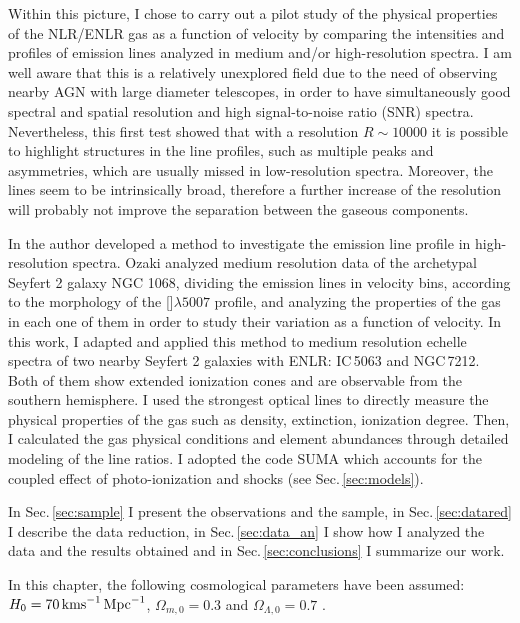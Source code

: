 \documentclass[../main.tex]{subfiles}
\begin{document}
Within this picture, I chose to carry out a pilot study of the physical properties of the NLR/ENLR gas as a function of velocity by comparing the intensities and profiles of emission lines analyzed in medium and/or high-resolution spectra.
I am well aware that this is a relatively unexplored field due to the need of observing nearby AGN with large diameter telescopes, in order to have simultaneously good spectral and spatial resolution and high signal-to-noise ratio (SNR) spectra.
Nevertheless, this first test showed that with a resolution $R \sim  10000$ it is possible to highlight structures in the line profiles, such as multiple peaks and asymmetries, which are usually missed in low-resolution spectra. 
Moreover, the lines seem to be intrinsically broad, therefore a further increase of the resolution will probably not improve the separation between the gaseous components.

In \citet{Ozaki09} the author developed a method to investigate the emission line profile in high-resolution spectra.
Ozaki analyzed medium resolution data of the archetypal Seyfert 2 galaxy NGC 1068, dividing the emission lines in velocity bins, according to the morphology of the []$\lambda5007$ profile, and analyzing the properties of the gas in each one of them in order to study their variation as a function of velocity.
In this work, I adapted and applied this method to medium resolution echelle spectra of two nearby Seyfert 2 galaxies with ENLR: IC\,5063 and NGC\,7212.
Both of them show extended ionization cones and are observable from the southern hemisphere.
I used the strongest optical lines to directly measure the physical properties of the gas such as density, extinction, ionization degree. 
Then, I calculated the gas physical conditions and element abundances through detailed modeling of the line ratios. 
I adopted the code SUMA \citep{Contini12} which accounts for the coupled effect of photo-ionization and shocks (see Sec.\,\ref{sec:models}).

In Sec.\,\ref{sec:sample} I present the observations and the sample, in Sec.\,\ref{sec:datared} I describe the data reduction, in Sec.\,\ref{sec:data_an} I show how I analyzed the data and the results obtained and in Sec.\,\ref{sec:conclusions} I summarize our work.

In this chapter, the following cosmological parameters have been assumed:  $H_0 = 70\,\si{\kms\,Mpc^{-1}}$, $\Omega_{m,0}=0.3$ and $\Omega_{\Lambda,0}=0.7$ \citep{Komatsu11}.
\end{document}

